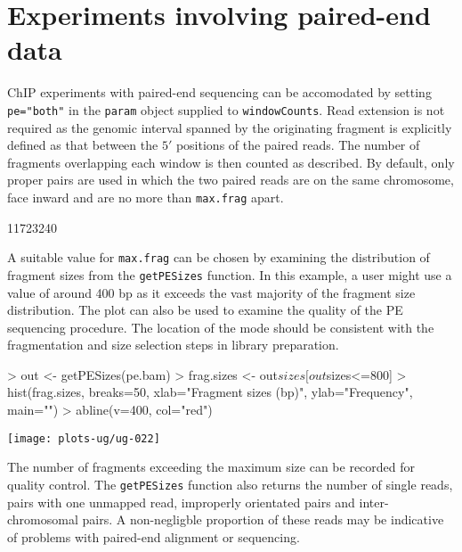 \documentclass[12pt]{report}
\renewenvironment{Schunk}{\vspace{0pt}}{\vspace{0pt}}
\newcommand{\code}[1]{{\small\texttt{#1}}}
\begin{document}
\section{Experiments involving paired-end data}
\label{data:pet}

ChIP experiments with paired-end sequencing can be accomodated by setting \code{pe="both"} in the \code{param} object supplied to \code{windowCounts}. 
Read extension is not required as the genomic interval spanned by the originating fragment is explicitly defined as that between the $5'$ positions of the paired reads.
The number of fragments overlapping each window is then counted as described. 
By default, only proper pairs are used in which the two paired reads are on the same chromosome, face inward and are no more than \code{max.frag} apart.

\begin{Schunk}
\begin{Soutput}
[1] 11723240
\end{Soutput}
\end{Schunk}

A suitable value for \code{max.frag} can be chosen by examining the distribution of fragment sizes from the \code{getPESizes} function. 
In this example, a user might use a value of around 400 bp as it exceeds the vast majority of the fragment size distribution. 
The plot can also be used to examine the quality of the PE sequencing procedure. 
The location of the mode should be consistent with the fragmentation and size selection steps in library preparation. 

\begin{Schunk}
\begin{Sinput}
> out <- getPESizes(pe.bam)
> frag.sizes <- out$sizes[out$sizes<=800]
> hist(frag.sizes, breaks=50, xlab="Fragment sizes (bp)", ylab="Frequency", main="")
> abline(v=400, col="red")
\end{Sinput}
\end{Schunk}

\begin{center}
\texttt{[image: plots-ug/ug-022]}
\end{center}

The number of fragments exceeding the maximum size can be recorded for quality control. 
The \code{getPESizes} function also returns the number of single reads, pairs with one unmapped read, improperly orientated pairs and inter-chromosomal pairs.
A non-negligble proportion of these reads may be indicative of problems with paired-end alignment or sequencing. 
\end{document}
